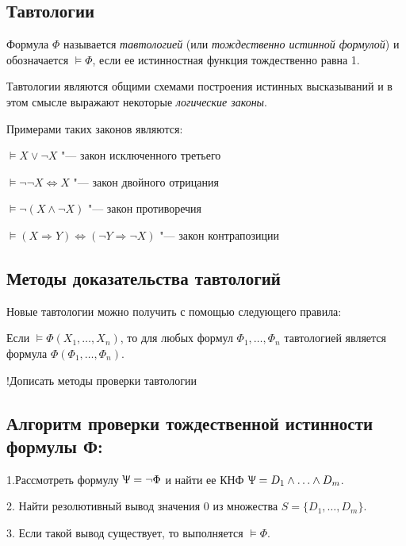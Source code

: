 \subsection*{Тавтологии}
\begin{definition}
    Формула $\Phi$ называется \textit{тавтологией} (или \textit{тождественно истинной формулой}) и обозначается $\vDash\Phi$, если ее истинностная функция тождественно равна 1.
\end{definition}

Тавтологии являются общими схемами построения истинных высказываний и в этом смысле выражают некоторые \textit{логические законы}.

Примерами таких законов являются:

$\vDash X \lor \lnot X$ "--- закон исключенного третьего

$\vDash\lnot\lnot X \Leftrightarrow X$ "--- закон двойного отрицания

$\vDash\lnot(X \land \lnot X)$ "--- закон противоречия

$\vDash(X\Rightarrow Y) \Leftrightarrow (\lnot Y \Rightarrow \lnot X)$ "--- закон контрапозиции

\subsection*{Методы доказательства тавтологий}
Новые тавтологии можно получить с помощью следующего правила:
\begin{theorem}
    Если $\vDash \Phi (X_1,\dots,X_n)$, то для любых формул $\Phi_1,\dots,\Phi_n$ тавтологией является формула $\Phi(\Phi_1,\dots,\Phi_n)$.
\end{theorem}

!Дописать методы проверки тавтологии

\subsection*{Алгоритм проверки тождественной истинности формулы Ф:}
1.Рассмотреть формулу $\Uppsi=\lnot \Phi$ и найти ее КНФ $\Uppsi = D_1\land\ldots\land D_m$.

2. Найти резолютивный вывод значения 0 из множества $S = \{D_1,\ldots,D_m\}$.

3. Если такой вывод существует, то выполняется $\models\Phi$.
